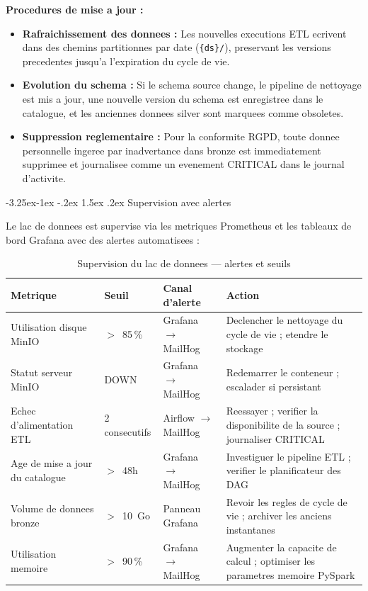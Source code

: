 \documentclass[a4paper,11pt,oneside,openany]{report}
\makeatletter
\renewcommand\subsection{\@startsection{subsection}{2}{\z@}%
  {-3.25ex\@plus -1ex \@minus -.2ex}%
  {1.5ex \@plus .2ex}%
  {\normalfont\large\bfseries\color{ntdarkgreen}}}
\newcommand{\rgpd}{RGPD}
\makeatother
\begin{document}
\textbf{Procedures de mise a jour :}
\begin{itemize}[nosep]
  \item \textbf{Rafraichissement des donnees :} Les nouvelles executions ETL ecrivent
        dans des chemins partitionnes par date (\texttt{\{ds\}/}), preservant les
        versions precedentes jusqu'a l'expiration du cycle de vie.
  \item \textbf{Evolution du schema :} Si le schema source change, le pipeline de
        nettoyage est mis a jour, une nouvelle version du schema est enregistree dans
        le catalogue, et les anciennes donnees silver sont marquees comme obsoletes.
  \item \textbf{Suppression reglementaire :} Pour la conformite \rgpd{}, toute donnee
        personnelle ingeree par inadvertance dans bronze est immediatement supprimee
        et journalisee comme un evenement CRITICAL dans le journal d'activite.
\end{itemize}

\subsection{Supervision avec alertes}

Le lac de donnees est supervise via les metriques Prometheus et les tableaux
de bord Grafana avec des alertes automatisees :

\begin{table}[H]
\centering
\caption{Supervision du lac de donnees --- alertes et seuils}
\label{tab:lake-monitoring}
\begin{tabularx}{\textwidth}{L{3.5cm} C{2cm} L{3cm} L{4cm}}
\toprule
\textbf{Metrique} & \textbf{Seuil} & \textbf{Canal d'alerte} & \textbf{Action} \\
\midrule
Utilisation disque MinIO & $>$~85\,\% & Grafana $\to$ MailHog & Declencher le nettoyage du cycle de vie ; etendre le stockage \\
Statut serveur MinIO & DOWN & Grafana $\to$ MailHog & Redemarrer le conteneur ; escalader si persistant \\
Echec d'alimentation ETL & 2 consecutifs & Airflow $\to$ MailHog & Reessayer ; verifier la disponibilite de la source ; journaliser CRITICAL \\
Age de mise a jour du catalogue & $>$~48h & Grafana $\to$ MailHog & Investiguer le pipeline ETL ; verifier le planificateur des DAG \\
Volume de donnees bronze & $>$~10~Go & Panneau Grafana & Revoir les regles de cycle de vie ; archiver les anciens instantanes \\
Utilisation memoire & $>$~90\,\% & Grafana $\to$ MailHog & Augmenter la capacite de calcul ; optimiser les parametres memoire PySpark \\
\bottomrule
\end{tabularx}
\end{table}
\end{document}
